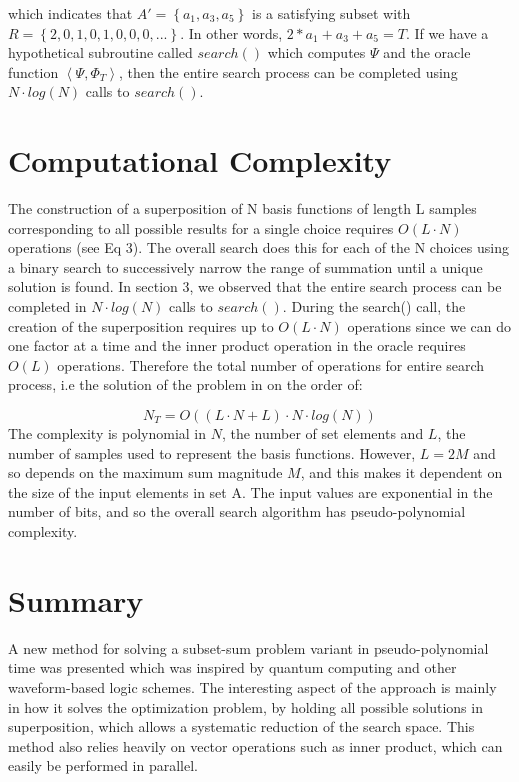 \documentclass[reqno]{amsart}
\theoremstyle{definition}
\theoremstyle{remark}
\begin{document}
\noindent
which indicates that $A'= \left\{a_1, a_3, a_5 \right\}$ is a satisfying subset with $R = \left\{2,0,1,0,1,0,0,0,...\right\}$. 
In other words, $2*a_1 + a_3 + a_5 = T $. If we have a hypothetical subroutine called $search()$ which computes $\Psi$ and the oracle function
$\left \langle  \Psi, \Phi _T  \right \rangle $, then the entire search process can be completed using $N\cdot log(N)$ calls to $search()$.




\section{Computational Complexity}
The construction of a superposition of N basis functions of length L samples corresponding to all possible results for a single choice requires $O(L\cdot N)$ operations (see Eq 3).  The overall search does this for each of the N choices using a binary search to successively narrow the range of summation until a unique solution is found. In section 3, we observed that the entire search process can be completed in $N\cdot log(N)$ calls to $search()$. During the search() call, the creation of the superposition requires up to $O(L\cdot N)$ operations since we can do one factor at a time and the inner product operation in the oracle requires $O(L)$ operations. Therefore the total number of operations for entire search process, i.e the solution of the problem in on the order of:

\begin{equation}
N_T = O( (L \cdot N + L) \cdot N\cdot log(N) )
\end{equation}
\noindent
The complexity is polynomial in $N$, the number of set elements and $L$, the number of samples used to represent the basis functions. However, $L = 2M$ and so depends on the maximum sum magnitude $M$, and this makes it dependent on the size of the input elements in set A. The input values are exponential in the number of bits, and so the overall search algorithm has pseudo-polynomial complexity.


\newpage
\section{Summary}
A new method for solving a subset-sum problem variant in pseudo-polynomial time was presented which was inspired by quantum computing and other waveform-based logic schemes. The interesting aspect of the approach is mainly in how it solves the optimization problem, by holding all possible solutions in superposition, which allows a systematic reduction of the search space. This method also relies heavily on vector operations such as inner product, which can easily be performed in parallel.
\end{document}
